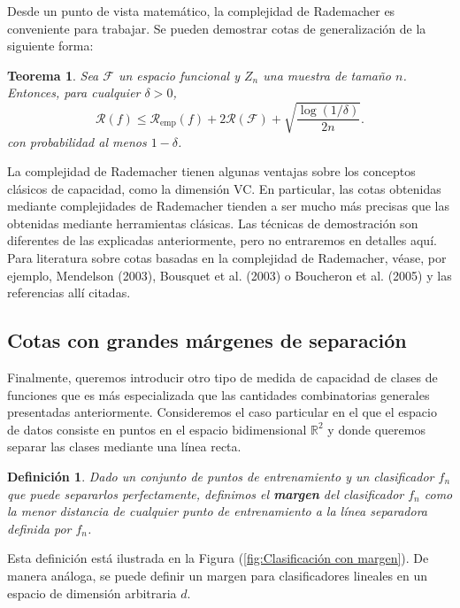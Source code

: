 \documentclass{report}
\newtheorem{thm}{Teorema}[section]
\newtheorem{dfn}{Definición}[section]
\begin{document}
Desde un punto de vista matemático, la complejidad de Rademacher es conveniente para trabajar. Se pueden 
demostrar cotas de generalización de la siguiente forma:
\begin{thm}
    Sea $\mathcal{F}$ un espacio funcional y $Z_n$ una muestra de tamaño $n$. Entonces, para cualquier $\delta > 0$,
\[
\mathcal{R}(f) \leq \mathcal{R}_{\text{emp}}(f) + 2\mathscr{R}(\mathcal{F}) + \sqrt{\frac{\log(1/\delta)}{2n}}.
\]
con probabilidad al menos \(1 - \delta\).\\
\end{thm}

La complejidad de Rademacher tienen algunas ventajas sobre los conceptos clásicos de capacidad, como la 
dimensión VC. En particular, las cotas obtenidas mediante complejidades de Rademacher tienden a ser mucho más 
precisas que las obtenidas mediante herramientas clásicas. Las técnicas de demostración son diferentes de las 
explicadas anteriormente, pero no entraremos en detalles aquí. Para literatura sobre cotas basadas en la 
complejidad de Rademacher, véase, por ejemplo, Mendelson (2003), Bousquet et al. (2003) o Boucheron et al. 
(2005) y las referencias allí citadas.

\subsection{Cotas con grandes márgenes de separación}

Finalmente, queremos introducir otro tipo de medida de capacidad de clases de funciones que es 
más especializada que las cantidades combinatorias generales presentadas anteriormente. Consideremos 
el caso particular en el que el espacio de datos consiste en puntos en el espacio bidimensional 
\(\mathbb{R}^2\) y donde queremos separar las clases mediante una línea recta. 

\begin{dfn}
    Dado un conjunto de puntos de entrenamiento y un clasificador \(f_n\) que puede separarlos perfectamente, definimos 
    el \textbf{margen} del clasificador \(f_n\) como la menor distancia de cualquier punto de entrenamiento 
    a la línea separadora definida por \(f_n\).  \label{def:margen} 
\end{dfn}

Esta definición está ilustrada en la Figura (\ref{fig:Clasificación con margen}). 
De manera análoga, se puede definir un margen para clasificadores lineales en un espacio de dimensión arbitraria \(d\).
\end{document}
